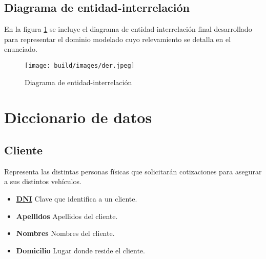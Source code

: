 \documentclass[a4paper,11pt]{article}
\begin{document}
\subsection{Diagrama de entidad-interrelación}

 En la figura \ref{fig:der} se incluye el diagrama de entidad-interrelación
 final desarrollado para representar el dominio modelado cuyo relevamiento se
 detalla en el enunciado.

\begin{figure}[h!t]
  \centering
  \texttt{[image: build/images/der.jpeg]}
  \caption{Diagrama de entidad-interrelación} \label{fig:der}
\end{figure}

\FloatBarrier





  

\section{Diccionario de datos}

\subsection{Cliente}

Representa las distintas personas físicas que solicitarán cotizaciones para asegurar 
a sus distintos vehículos.

\begin{itemize}

  \item \textbf{\uline{DNI}} Clave que identifica a un cliente.
  
  \item \textbf{Apellidos} Apellidos del cliente.

  \item \textbf{Nombres} Nombres del cliente.
  
  \item \textbf{Domicilio} Lugar donde reside el cliente.
  
\end{itemize}
\end{document}

